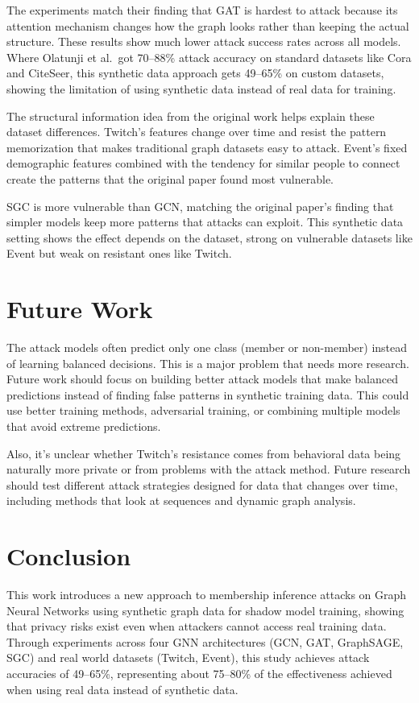 \documentclass{article}
\begin{document}
The experiments match their finding that GAT is hardest to attack because its attention mechanism changes how the graph looks rather than keeping the actual structure. These results show much lower attack success rates across all models. Where Olatunji et al.\ got 70--88\% attack accuracy on standard datasets like Cora and CiteSeer, this synthetic data approach gets 49--65\% on custom datasets, showing the limitation of using synthetic data instead of real data for training.

The structural information idea from the original work helps explain these dataset differences. Twitch's features change over time and resist the pattern memorization that makes traditional graph datasets easy to attack. Event's fixed demographic features combined with the tendency for similar people to connect create the patterns that the original paper found most vulnerable.

SGC is more vulnerable than GCN, matching the original paper's finding that simpler models keep more patterns that attacks can exploit. This synthetic data setting shows the effect depends on the dataset, strong on vulnerable datasets like Event but weak on resistant ones like Twitch.

\section{Future Work}

The attack models often predict only one class (member or non-member) instead of learning balanced decisions. This is a major problem that needs more research. Future work should focus on building better attack models that make balanced predictions instead of finding false patterns in synthetic training data. This could use better training methods, adversarial training, or combining multiple models that avoid extreme predictions.

Also, it's unclear whether Twitch's resistance comes from behavioral data being naturally more private or from problems with the attack method. Future research should test different attack strategies designed for data that changes over time, including methods that look at sequences and dynamic graph analysis.

\section{Conclusion}
This work introduces a new approach to membership inference attacks on Graph Neural Networks using synthetic graph data for shadow model training, showing that privacy risks exist even when attackers cannot access real training data. Through experiments across four GNN architectures (GCN, GAT, GraphSAGE, SGC) and real world datasets (Twitch, Event), this study achieves attack accuracies of 49--65\%, representing about 75--80\% of the effectiveness achieved when using real data instead of synthetic data.
\end{document}
